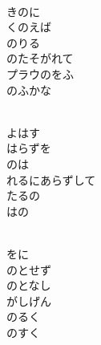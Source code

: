 \documentclass[10pt,b5j]{tarticle} %
\begin{document}
\begin{enumerate}
\begin{minipage}[c]{\blocksize}
        \vspace{\linespace}
        \item~\\
        きのに\\
        くのえば\\
        のりる\\
        のたそがれて\\
        プラウのをふ\\
        のふかな
        
        \vspace{\linespace}
        \item~\\
        よはす\\
        はらずを\\
        のは\\
        れるにあらずして\\
        たるの\\
        はの
        
        \vspace{\linespace}
        \item~\\
        をに\\
        のとせず\\
        のとなし\\
        がしげん\\
        のるく\\
        のすく
    
    \end{minipage}
\end{enumerate} %
\end{document}
